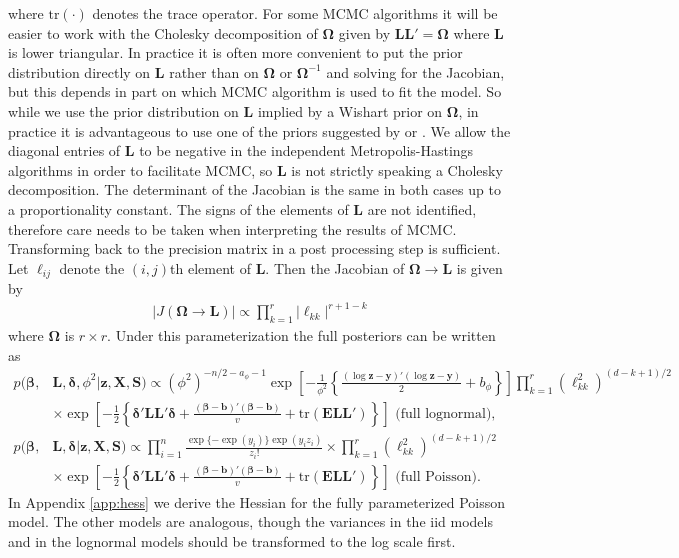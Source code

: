 \documentclass[12pt]{article}
\begin{document}
where $\mathrm{tr}(\cdot)$ denotes the trace operator. For some MCMC algorithms it will be easier to work with the Cholesky decomposition of $\bm{\Omega}$ given by $\bm{L}\bm{L}'=\bm{\Omega}$ where $\bm{L}$ is lower triangular. In practice it is often more convenient to put the prior distribution directly on $\bm{L}$ rather than on $\bm{\Omega}$ or $\bm{\Omega}^{-1}$ and solving for the Jacobian, but this depends in part on which MCMC algorithm is used to fit the model. So while we use the prior distribution on $\bm{L}$ implied by a Wishart prior on $\bm{\Omega}$, in practice it is advantageous to use one of the priors suggested by \citet{chen2003random} or \citet{fruhwirth2008bayesian}. We allow the diagonal entries of $\bm{L}$ to be negative in the independent Metropolis-Hastings algorithms in order to facilitate MCMC, so $\bm{L}$ is not strictly speaking a Cholesky decomposition. The determinant of the Jacobian is the same in both cases up to a proportionality constant. The signs of the elements of $\bm{L}$ are not identified, therefore care needs to be taken when interpreting the results of MCMC. Transforming back to the precision matrix in a post processing step is sufficient. Let $\ell_{ij}$ denote the $(i,j)$th element of $\bm{L}$. Then the Jacobian of $\bm{\Omega}\to\bm{L}$ is given by
\begin{align*}
|J(\bm{\Omega}\to\bm{L})| \propto \prod_{k=1}^r |\ell_{kk}|^{r + 1 - k}
\end{align*}
where $\bm{\Omega}$ is $r\times r$. Under this parameterization the full posteriors can be written as
\begin{align}
p(\bm{\beta},& \bm{L}, \bm{\delta}, \phi^2|\bm{z}, \bm{X}, \bm{S}) \propto (\phi^2)^{-n/2 - a_\phi - 1}\exp\left[-\frac{1}{\phi^2}\left\{\frac{(\log\bm{z} - \bm{y})'(\log\bm{z} - \bm{y})}{2} + b_\phi\right\}\right] \prod_{k=1}^r (\ell_{kk}^2)^{(d - k + 1)/2}\nonumber\\
&\times \exp\left[-\frac{1}{2}\left\{\bm{\delta}'\bm{L}\bm{L}'\bm{\delta}+\frac{(\bm{\beta} - \bm{b})'(\bm{\beta} - \bm{b})}{v} + \mathrm{tr}(\bm{E}\bm{L}\bm{L}')\right\}\right]\mbox{\ \ \ \ \ (full lognormal),}\label{eq:fullnormpostchol}\\
p(\bm{\beta},& \bm{L}, \bm{\delta}|\bm{z}, \bm{X}, \bm{S}) \propto \prod_{i=1}^n \frac{\exp\{-\exp(y_i)\}\exp(y_iz_i)}{z_i!} \times \prod_{k=1}^r (\ell_{kk}^2)^{(d - k + 1)/2}  \nonumber\\
&\times \exp\left[-\frac{1}{2}\left\{\bm{\delta}'\bm{L}\bm{L}'\bm{\delta}+\frac{(\bm{\beta} - \bm{b})'(\bm{\beta} - \bm{b})}{v} + \mathrm{tr}(\bm{E}\bm{L}\bm{L}')\right\}\right]\mbox{\ \ \ \ \ (full Poisson).}\label{eq:fullpoispostchol}
\end{align}
In Appendix \ref{app:hess} we derive the Hessian for the fully parameterized Poisson model. The other models are analogous, though the variances in the iid models and in the lognormal models should be transformed to the log scale first.
\end{document}
